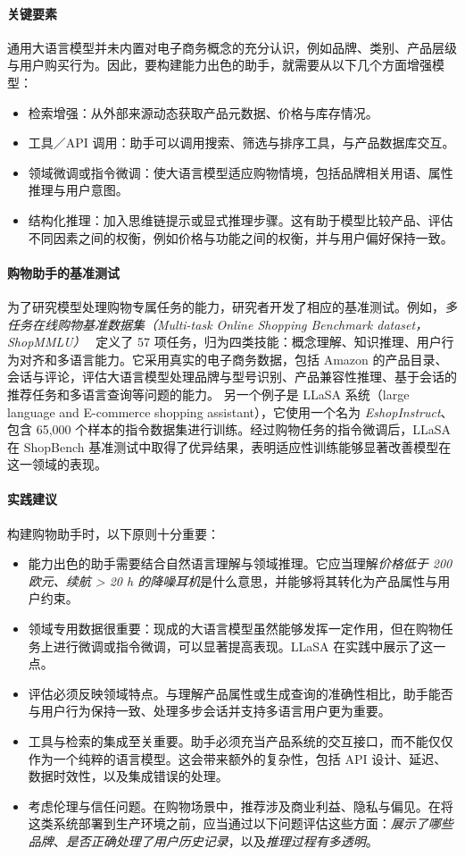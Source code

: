 \paragraph{关键要素}
通用大语言模型并未内置对电子商务概念的充分认识，例如品牌、类别、产品层级与用户购买行为。因此，要构建能力出色的助手，就需要从以下几个方面增强模型：
\begin{itemize}
  \item 检索增强：从外部来源动态获取产品元数据、价格与库存情况。
  \item 工具／API 调用：助手可以调用搜索、筛选与排序工具，与产品数据库交互。
  \item 领域微调或指令微调：使大语言模型适应购物情境，包括品牌相关用语、属性推理与用户意图。
  \item 结构化推理：加入思维链提示或显式推理步骤。这有助于模型比较产品、评估不同因素之间的权衡，例如价格与功能之间的权衡，并与用户偏好保持一致。
\end{itemize}

\paragraph{购物助手的基准测试}
为了研究模型处理购物专属任务的能力，研究者开发了相应的基准测试。例如，{\em 多任务在线购物基准数据集（Multi-task Online Shopping Benchmark dataset，ShopMMLU）}~\citep{jin2024shopping} 定义了 57 项任务，归为四类技能：概念理解、知识推理、用户行为对齐和多语言能力。它采用真实的电子商务数据，包括 Amazon 的产品目录、会话与评论，评估大语言模型处理品牌与型号识别、产品兼容性推理、基于会话的推荐任务和多语言查询等问题的能力。
另一个例子是 LLaSA 系统（large language and E-commerce shopping assistant）\citep{zhang2024llasa}，它使用一个名为 {\em EshopInstruct}、包含 65,000 个样本的指令数据集进行训练。经过购物任务的指令微调后，LLaSA 在 ShopBench 基准测试中取得了优异结果，表明适应性训练能够显著改善模型在这一领域的表现。

\paragraph{实践建议}
构建购物助手时，以下原则十分重要：
\begin{itemize}
  \item 能力出色的助手需要结合自然语言理解与领域推理。它应当理解{\em 价格低于 200 欧元、续航 > 20 h 的降噪耳机}是什么意思，并能够将其转化为产品属性与用户约束。
  \item 领域专用数据很重要：现成的大语言模型虽然能够发挥一定作用，但在购物任务上进行微调或指令微调，可以显著提高表现。LLaSA \citep{zhang2024llasa} 在实践中展示了这一点。
  \item 评估必须反映领域特点。与理解产品属性或生成查询的准确性相比，助手能否与用户行为保持一致、处理多步会话并支持多语言用户更为重要。
  \item 工具与检索的集成至关重要。助手必须充当产品系统的交互接口，而不能仅仅作为一个纯粹的语言模型。这会带来额外的复杂性，包括 API 设计、延迟、数据时效性，以及集成错误的处理。
  \item 考虑伦理与信任问题。在购物场景中，推荐涉及商业利益、隐私与偏见。在将这类系统部署到生产环境之前，应当通过以下问题评估这些方面：{\em 展示了哪些品牌}、{\em 是否正确处理了用户历史记录}，以及{\em 推理过程有多透明}。
\end{itemize}

